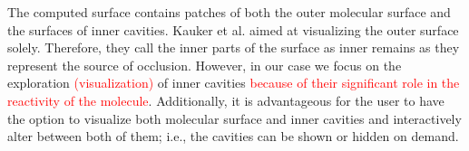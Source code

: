 
The computed surface contains patches of both the outer molecular surface and the surfaces of inner cavities.
Kauker et al. \cite{kauker2013rendering} aimed at visualizing the outer surface solely.
Therefore, they call the inner parts of the surface as inner remains as they represent the source of occlusion.
However, in our case we focus on the exploration \textcolor{red}{(visualization)} of inner cavities \textcolor{red}{because of their significant role in the reactivity of the molecule}.
Additionally, it is advantageous for the user to have the option to visualize both molecular surface and inner cavities and interactively alter between both of them; i.e., the cavities can be shown or hidden on demand.

